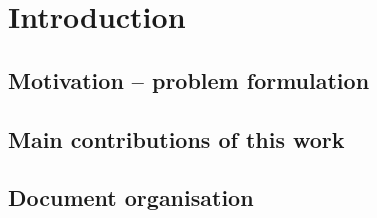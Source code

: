 \chapter{Introduction}
\label{chapter:introduction}

\lipsum[1]


\section{Motivation – problem formulation}
\label{section:motivation}

\lipsum[1]


\section{Main contributions of this work}
\label{section:contributions}

\lipsum[1]


\section{Document organisation}
\label{section:document-organisation}

\lipsum[1]
